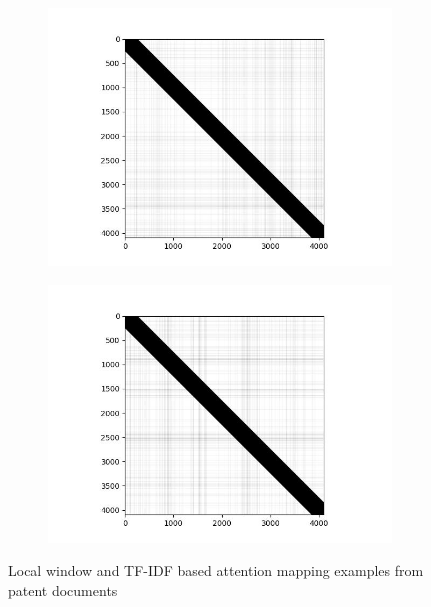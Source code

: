 \begin{figure}[h]
    \begin{subfigure}[b]{0.49\textwidth}
        \includegraphics[width=1\textwidth]{images/1_local_and_tfidf.jpg}
        \caption{}
        \label{fig:tfidf_mapping2}
    \end{subfigure}
    \hfill %
    \begin{subfigure}[b]{0.49\textwidth}
        \includegraphics[width=1\textwidth]{images/4_local_and_tfidf.jpg}
        \caption{}
        \label{fig:tfidf_mapping3}
    \end{subfigure}
\caption{Local window and TF-IDF based attention mapping examples from patent documents}
\label{fig:custom_mapping_examples}
\end{figure}
